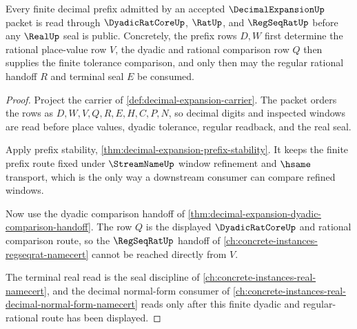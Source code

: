 \begin{theorem}
\label{thm:decimal-expansion-dyadic-rational-readback}
Every finite decimal prefix admitted by an accepted $\DecimalExpansionUp$ packet is read through $\DyadicRatCoreUp$, $\RatUp$, and $\RegSeqRatUp$ before any $\RealUp$ seal is public. Concretely, the prefix rows $D,W$ first determine the rational place-value row $V$, the dyadic and rational comparison row $Q$ then supplies the finite tolerance comparison, and only then may the regular rational handoff $R$ and terminal seal $E$ be consumed.
\end{theorem}
\begin{proof}
Project the carrier of \autoref{def:decimal-expansion-carrier}. The packet orders the rows as $D,W,V,Q,R,E,H,C,P,N$, so decimal digits and inspected windows are read before place values, dyadic tolerance, regular readback, and the real seal.

Apply prefix stability, \autoref{thm:decimal-expansion-prefix-stability}. It keeps the finite prefix route fixed under $\StreamNameUp$ window refinement and $\hsame$ transport, which is the only way a downstream consumer can compare refined windows.

Now use the dyadic comparison handoff of \autoref{thm:decimal-expansion-dyadic-comparison-handoff}. The row $Q$ is the displayed $\DyadicRatCoreUp$ and rational comparison route, so the $\RegSeqRatUp$ handoff of \autoref{ch:concrete-instances-regseqrat-namecert} cannot be reached directly from $V$.

The terminal real read is the seal discipline of \autoref{ch:concrete-instances-real-namecert}, and the decimal normal-form consumer of \autoref{ch:concrete-instances-real-decimal-normal-form-namecert} reads only after this finite dyadic and regular-rational route has been displayed.
\end{proof}

